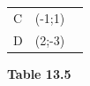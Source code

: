 {{\begin{center}
\begin{xtabular}[t]{|l|l|l|}
    
        C &
    
    
        (-1;1) &
    
    
     \tabularnewline{}
    
    
        D &
    
    
        (2;-3) &
    
    
     \tabularnewline{}
    \end{xtabular}
      \end{center}
    \begin{center}{\small\bfseries Table 13.5}\end{center}
    
    \addtocounter{footnote}{-0}
    
          } %
        }{%
        }
